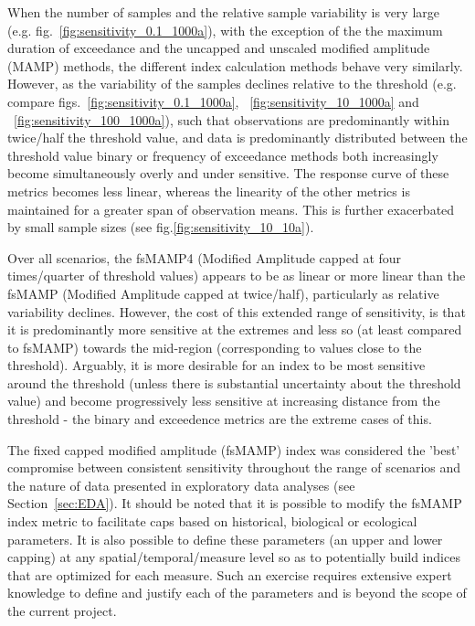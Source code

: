 When the number of samples and the relative sample variability is very large
(e.g. fig.~\ref{fig:sensitivity_0.1_1000a}), with the exception of the the maximum duration of
exceedance and the uncapped and unscaled modified amplitude (MAMP) methods, the different index
calculation methods behave very similarly.  However, as the variability of the samples declines
relative to the threshold (e.g. compare figs.~\ref{fig:sensitivity_0.1_1000a},
~\ref{fig:sensitivity_10_1000a} and ~\ref{fig:sensitivity_100_1000a}), such that observations are
predominantly within twice/half the threshold value, %
and data is predominantly distributed between the threshold value %
binary or frequency of exceedance methods both increasingly become simultaneously overly and under
sensitive.  The response curve of these metrics becomes less linear, whereas the linearity of the
other metrics is maintained for a greater span of observation means.  This is further exacerbated by
small sample sizes (see fig.\ref{fig:sensitivity_10_10a}).

Over all scenarios, the fsMAMP4 (Modified Amplitude capped at four times/quarter of threshold
values) appears to be as linear or more linear than the fsMAMP (Modified Amplitude capped at
twice/half), particularly as relative variability declines.  However, the cost of this extended
range of sensitivity, is that it is predominantly more sensitive at the extremes and less so (at
least compared to fsMAMP) towards the mid-region (corresponding to values close to the threshold).
Arguably, it is more desirable for an index to be most sensitive around the threshold (unless there
is substantial uncertainty about the threshold value) and become progressively less sensitive at
increasing distance from the threshold - the binary and exceedence metrics are the extreme cases of
this.


The fixed capped modified amplitude (fsMAMP) index was considered the 'best' compromise between
consistent sensitivity throughout the range of scenarios and the nature of data presented in
exploratory data analyses (see Section~\ref{sec:EDA}).  It should be noted that it is possible to
modify the fsMAMP index metric to facilitate caps based on historical, biological or ecological
parameters.  It is also possible to define these parameters (an upper and lower capping) at any
spatial/temporal/measure level so as to potentially build indices that are optimized for each
measure.  Such an exercise requires extensive expert knowledge to define and justify each of the
parameters and is beyond the scope of the current project.


